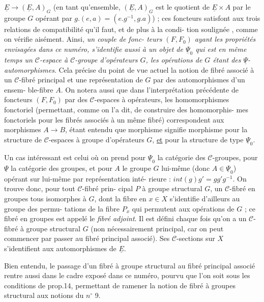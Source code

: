$\underline{E} \to (\underline{E},A)_G$ (en tant qu'ensemble, $(\underline{E},A)_G$ est le quotient de $\underline{E} \times A$ par le
groupe $G$ opérant par $g.(e,a) = (e.g^{-1},g.a)$) ; ces foncteurs satisfont
aux trois relations de compatibilité qu'il faut, et de plus à la condi-
tion soulignée , comme on vérifie aisément. Ainsi, \emph{un couple de fonc-
teurs $(F,F_0)$ ayant les propriétés envisagées dans ce numéro, s'identifie
aussi à un objet de $\underline{\Psi}_0$ qui est en même temps un $\mathcal{C}$-espace à $\mathcal{C}$-groupe
d'opérateurs $G$, les opérations de $G$ étant des $\underline{\Psi}$-automorphismes}. Cela
précise du point de vue actuel la notion de fibré associé à un $\mathcal{C}$-fibré
principal et une représentation de $G$ par des automorphismes d'un ensem-
ble-fibre $A$. On notera aussi que dans l'interprétation précédente de
foncteurs $(F,F_0)$ par des $\mathcal{C}$-espaces à opérateurs, les homomorphismes
fonctoriel (permettant, comme on l'a dit, de construire des homomorphis-
mes fonctoriels pour les fibrés associés à un même fibré) correspondent
aux morphismes $A \to B$, étant entendu que morphisme signifie morphisme
pour la structure de $\mathcal{C}$-espaces à groupe d'opérateurs $G$, \underline{et} pour la
structure de type $\underline{\Psi}_0$.

Un cas intéressant est celui où on prend pour $\underline{\Psi}_0$ la catégorie des
$\mathcal{C}$-groupes, pour $\underline{\Psi}$ la catégorie des groupes, et pour $A$ le groupe
$G$ lui-même (donc $A \in \underline{\Psi}_0$) opérant sur lui-même par représentation inté-
rieure : $int(g)g' = gg'g^{-1}$. On trouve donc, pour tout $\mathcal{C}$-fibré prin-
cipal $P$ à groupe structural $G$, un $\mathcal{C}$-fibré en groupes tous isomorphes
à $G$, dont la fibre en $x \in X$ s'identifie d'ailleurs au groupe des permu-
tations de la fibre $P_x$ qui permutent aux opérations de $G$ ; ce fibré en
groupes est appelé le \emph{fibré adjoint}. Il est défini chaque fois qu'on a
un $\mathcal{C}$-fibré à groupe structural $G$ (non nécessairement principal, car
on peut commencer par passer au fibré principal associé). Ses $\mathcal{C}$-sections
sur $X$ s'identifient aux automorphismes de $\underline{E}$.

\newpage



Bien entendu, le passage d'un fibré à groupe structural au fibré
principal associé rentre aussi dans le cadre exposé dans ce numéro,
pourvu que l'on soit sous les conditions de prop.14, permettant de
ramener la notion de fibré à groupes structural aux notions du $n^\circ$ 9.

